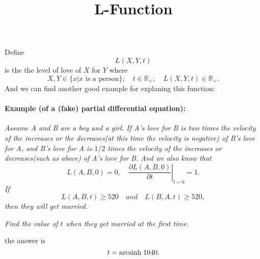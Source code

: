 \documentclass{article}
\title{L-Function}
\author{}
\date{}
\begin{document}
\maketitle
Define
\[L(X,Y,t)\]
is the the level of love of $X$ for $Y$ where
\[{X,Y}\in \{x|x\text{ is a person}\};\quad t\in\mathbb{R}_+;\quad L(X,Y,t)\in\mathbb{R}_+.\]
And we can find another good example for explaning this function:
\paragraph{Example (of a (fake) partial differential equation): }\textit{Assume A and B are a boy and a girl. If A's love for B is two times the velocity of the increases or the decreases(at this time the velocity is negative) of B's love for A, and B's love for A is $1/2$ times the velocity of the increases or decreases(such as above) of A's love for B. And we also know that
\[L(A,B,0)=0,\quad\left.\frac{\partial L(A,B,0)}{\partial t}\right|_{t=0}=1.\]
If
\[L(A,B,t)\ge 520\quad and\quad L(B,A,t)\ge 520,\]
then they will get married.}\par
\textit{Find the value of $t$ when they get married at the first time.}\par
the answer is 
\[t=\mathrm{arcsinh}\hspace{0.3em}1040.\]
\end{document}
